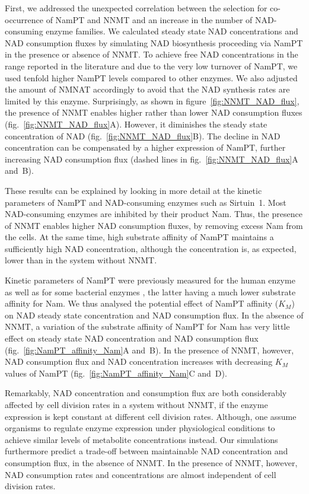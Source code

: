 First, we addressed the unexpected correlation between the selection for co-occurrence of NamPT and NNMT and an increase in the number of NAD-consuming enzyme families. We calculated steady state NAD concentrations and NAD consumption fluxes by simulating NAD biosynthesis proceeding via NamPT in the presence or absence of NNMT. To achieve free NAD concentrations in the range reported in the literature and due to the very low turnover of NamPT, we used tenfold higher NamPT levels compared to other enzymes. We also adjusted the amount of NMNAT accordingly to avoid that the NAD synthesis rates are limited by this enzyme. Surprisingly, as shown in figure~\ref{fig:NNMT_NAD_flux}, the presence of NNMT enables higher rather than lower NAD consumption fluxes (fig.~\ref{fig:NNMT_NAD_flux}A). However, it diminishes the steady state concentration of NAD (fig.~\ref{fig:NNMT_NAD_flux}B). The decline in NAD concentration can be compensated by a higher expression of NamPT, further increasing NAD consumption flux (dashed lines in fig.~\ref{fig:NNMT_NAD_flux}A and~B).

These results can be explained by looking in more detail at the kinetic parameters of NamPT and NAD-consuming enzymes such as Sirtuin~1. Most NAD-consuming enzymes are inhibited by their product Nam. Thus, the presence of NNMT enables higher NAD consumption fluxes, by removing excess Nam from the cells. At the same time, high substrate affinity of NamPT maintains a sufficiently high NAD concentration, although the concentration is, as expected, lower than in the system without NNMT.

Kinetic parameters of NamPT were previously measured for the human enzyme \cite{Burgos2008} as well as for some bacterial enzymes \cite{Sorci2010}, the latter having a much lower substrate affinity for Nam. We thus analysed the potential effect of NamPT affinity ($K_{M}$) on NAD steady state concentration and NAD consumption flux. In the absence of NNMT, a variation of the substrate affinity of NamPT for Nam has very little effect on steady state NAD concentration and NAD consumption flux (fig.~\ref{fig:NamPT_affinity_Nam}A and~B). In the presence of NNMT, however, NAD consumption flux and NAD concentration increases with decreasing $K_{M}$ values of NamPT (fig.~\ref{fig:NamPT_affinity_Nam}C and~D).

Remarkably, NAD concentration and consumption flux are both considerably affected by cell division rates in a system without NNMT, if the enzyme expression is kept constant at different cell division rates. Although, one assume organisms to regulate enzyme expression under physiological conditions to achieve similar levels of metabolite concentrations instead.  Our simulations furthermore predict  a trade-off  between maintainable NAD concentration and consumption flux, in the absence of NNMT. In the presence of NNMT, however, NAD consumption rates and concentrations are almost independent of cell division rates.

